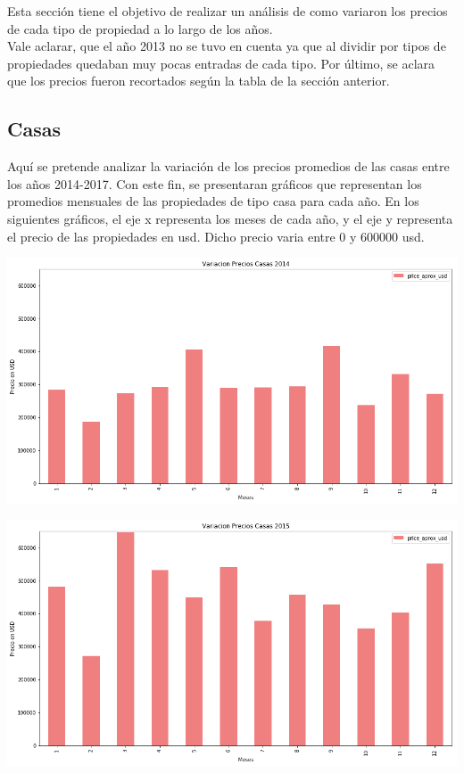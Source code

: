 \documentclass[a4paper, 10pt]{article}
\begin{document}
			Esta sección tiene el objetivo de realizar un análisis de como variaron los precios de cada tipo de propiedad a lo largo de los años.\\
			Vale aclarar, que el año 2013 no se tuvo en cuenta ya que al dividir por tipos de propiedades quedaban muy pocas entradas de cada tipo.
			Por último, se aclara que los precios fueron recortados según la tabla de la sección anterior.
			
			\subsection{Casas}
			
			Aquí se pretende analizar la variación de los precios promedios de las casas entre los años 2014-2017. Con este fin, se presentaran gráficos que representan los promedios mensuales de las propiedades de tipo casa para cada año. En los siguientes gráficos, el eje x representa los meses de cada año, y el eje y representa el precio de las propiedades en usd. Dicho
precio varia entre 0 y 600000 usd.

			\begin{center}
   		    		\includegraphics[width=\textwidth]{images/vCasa2014}
			\end{center}

			\begin{center}
   		    		\includegraphics[width=\textwidth]{images/vCasa2015}
			\end{center}			
			
\end{document}
